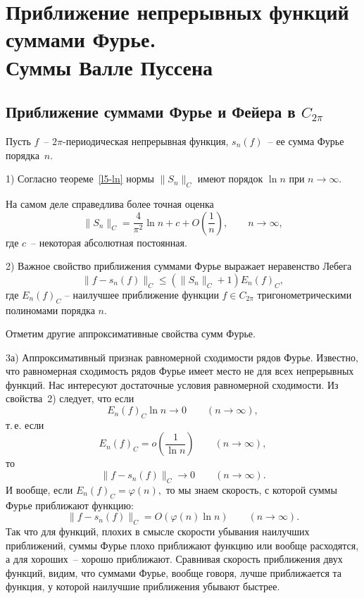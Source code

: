 

\chapter{Приближение непрерывных функций суммами Фурье. \\
Суммы Валле Пуссена} \label{ch6} %

\section{Приближение суммами Фурье и Фейера в $C_{2\pi}$}


Пусть $f$~-- $2\pi$-периодическая непрерывная функция, $s_n(f)$~-- ее сумма Фурье
порядка~$n$.

1) Согласно теореме~\ref{l5-ln} нормы $\|S_n\|_C$ имеют порядок $\ln n$ при
$n\to\infty$.

\begin{Remark}
На самом деле справедлива более точная оценка
$$
\|S_n\|_C=\frac{4}{\pi^2}\ln n+c+O\left( \frac{1}{n}\right), \qquad n\to\infty,
$$
где $c$~-- некоторая абсолютная постоянная.
\end{Remark}

2) Важное свойство приближения суммами Фурье выражает неравенство Лебега
$$
\|f-s_n(f)\|_C\le (\|S_n\|_C+1) E_n(f)_C,
$$
где $E_n(f)_C$ -- наилучшее приближение функции $f\in C_{2\pi}$
тригонометрическими полиномами порядка $n.$

Отметим другие аппроксимативные свойства сумм Фурье.

3а) Аппроксимативный признак равномерной сходимости рядов Фурье. Известно, что равномерная
сходимость рядов Фурье имеет место не для всех непрерывных
функций. Нас интересуют достаточные условия равномерной сходимости.
Из свойства~2) следует, что если
$$
E_n(f)_C\ln n \to 0\qquad (n\to \infty),
$$
т.\,е. если
$$
E_n(f)_C=o\left( \frac{1}{\ln n}\right) \qquad (n\to \infty),
$$
то
$$
\|f-s_n(f)\|_C\to 0 \qquad (n\to \infty).
$$
И вообще, если $E_n(f)_C=\varphi(n),$
то мы знаем скорость, с которой суммы Фурье приближают функцию:
$$
\|f-s_n(f)\|_C=O(\varphi(n)\ln n)\qquad (n\to \infty).
$$
Так что для функций, плохих в смысле скорости убывания наилучших приближений, суммы
Фурье плохо приближают функцию или вообще расходятся, а для хороших~-- хорошо приближают.
Сравнивая скорость приближения двух функций, видим, что
суммами Фурье, вообще говоря, лучше приближается та функция, у которой
наилучшие приближения убывают быстрее.

